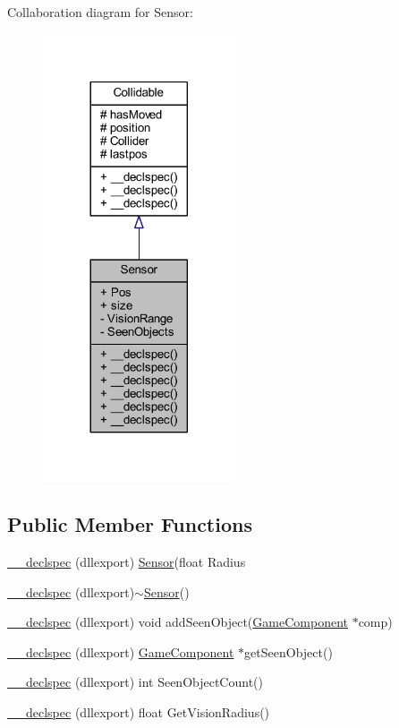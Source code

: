 Collaboration diagram for Sensor\-:\nopagebreak
\begin{figure}[H]
\begin{center}
\leavevmode
\includegraphics[width=161pt]{class_sensor__coll__graph}
\end{center}
\end{figure}
\subsection*{Public Member Functions}
\begin{DoxyCompactItemize}
\item 
\hyperlink{class_sensor_a4f89a2fee3bb2c07456663cf1754349f}{\-\_\-\-\_\-declspec} (dllexport) \hyperlink{class_sensor}{Sensor}(float Radius
\item 
\hyperlink{class_sensor_abc51a9ae7218821ab1b654128c86e040}{\-\_\-\-\_\-declspec} (dllexport)$\sim$\hyperlink{class_sensor}{Sensor}()
\item 
\hyperlink{class_sensor_ae45fa029bf2b21de83d61f844264737e}{\-\_\-\-\_\-declspec} (dllexport) void add\-Seen\-Object(\hyperlink{class_game_component}{Game\-Component} $\ast$comp)
\item 
\hyperlink{class_sensor_ab8b300abed2a48c4d8eb428b98f61b26}{\-\_\-\-\_\-declspec} (dllexport) \hyperlink{class_game_component}{Game\-Component} $\ast$get\-Seen\-Object()
\item 
\hyperlink{class_sensor_acec7b3c912027a73cf8bb6bd9b8dea93}{\-\_\-\-\_\-declspec} (dllexport) int Seen\-Object\-Count()
\item 
\hyperlink{class_sensor_ae6cb553783aed562549b97a02ba46d3d}{\-\_\-\-\_\-declspec} (dllexport) float Get\-Vision\-Radius()
\end{DoxyCompactItemize}
